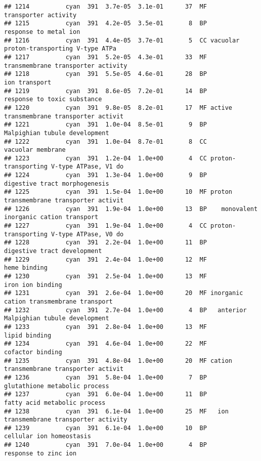 \documentclass[]{article}
\begin{document}
\begin{verbatim}
## 1214          cyan  391  3.7e-05  3.1e-01      37  MF                     transporter activity
## 1215          cyan  391  4.2e-05  3.5e-01       8  BP                    response to metal ion
## 1216          cyan  391  4.4e-05  3.7e-01       5  CC vacuolar proton-transporting V-type ATPa
## 1217          cyan  391  5.2e-05  4.3e-01      33  MF       transmembrane transporter activity
## 1218          cyan  391  5.5e-05  4.6e-01      28  BP                            ion transport
## 1219          cyan  391  8.6e-05  7.2e-01      14  BP              response to toxic substance
## 1220          cyan  391  9.8e-05  8.2e-01      17  MF active transmembrane transporter activit
## 1221          cyan  391  1.0e-04  8.5e-01       9  BP            Malpighian tubule development
## 1222          cyan  391  1.0e-04  8.7e-01       8  CC                        vacuolar membrane
## 1223          cyan  391  1.2e-04  1.0e+00       4  CC proton-transporting V-type ATPase, V1 do
## 1224          cyan  391  1.3e-04  1.0e+00       9  BP            digestive tract morphogenesis
## 1225          cyan  391  1.5e-04  1.0e+00      10  MF proton transmembrane transporter activit
## 1226          cyan  391  1.9e-04  1.0e+00      13  BP    monovalent inorganic cation transport
## 1227          cyan  391  1.9e-04  1.0e+00       4  CC proton-transporting V-type ATPase, V0 do
## 1228          cyan  391  2.2e-04  1.0e+00      11  BP              digestive tract development
## 1229          cyan  391  2.4e-04  1.0e+00      12  MF                             heme binding
## 1230          cyan  391  2.5e-04  1.0e+00      13  MF                         iron ion binding
## 1231          cyan  391  2.6e-04  1.0e+00      20  MF inorganic cation transmembrane transport
## 1232          cyan  391  2.7e-04  1.0e+00       4  BP   anterior Malpighian tubule development
## 1233          cyan  391  2.8e-04  1.0e+00      13  MF                            lipid binding
## 1234          cyan  391  4.6e-04  1.0e+00      22  MF                         cofactor binding
## 1235          cyan  391  4.8e-04  1.0e+00      20  MF cation transmembrane transporter activit
## 1236          cyan  391  5.8e-04  1.0e+00       7  BP            glutathione metabolic process
## 1237          cyan  391  6.0e-04  1.0e+00      11  BP             fatty acid metabolic process
## 1238          cyan  391  6.1e-04  1.0e+00      25  MF   ion transmembrane transporter activity
## 1239          cyan  391  6.1e-04  1.0e+00      10  BP                 cellular ion homeostasis
## 1240          cyan  391  7.0e-04  1.0e+00       4  BP                     response to zinc ion

\end{verbatim}
\end{document}
